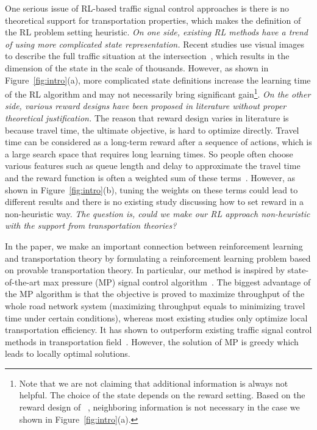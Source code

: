 {One serious issue of RL-based traffic signal control approaches is there is no theoretical support for transportation properties, which makes the definition of the RL problem setting heuristic. 
\emph{On one side, existing RL methods have a trend of using more complicated state representation.} Recent studies use visual images to describe the full traffic situation at the intersection~\cite{VaOl16,wei2018intellilight}, which results in the dimension of the state in the scale of thousands. However, as shown in Figure~\ref{fig:intro}(a), more complicated state definitions increase the learning time of the RL algorithm and may not necessarily bring significant gain\footnote{Note that we are not claiming that additional information is always not helpful. The choice of the state depends on the reward setting. Based on the reward design of \Deeplight~\cite{wei2018intellilight}, neighboring information is not necessary in the case we shown in Figure~\ref{fig:intro}(a).}. 
\emph{On the other side, various reward designs have been proposed in literature without proper theoretical justification.} The reason that reward design varies in literature is because travel time, the ultimate objective, is hard to optimize directly. Travel time can be considered as a long-term reward after a sequence of actions, which is a large search space that requires long learning times. So people often choose various features such as queue length and delay to approximate the travel time and the reward function is often a weighted sum of these terms~\cite{VaOl16,BPT14,ElAb10,ElAA13,wei2018intellilight}. However, as shown in Figure~\ref{fig:intro}(b), tuning the weights on these terms could lead to different results and there is no existing study discussing how to set reward in a non-heuristic way. \emph{The question is, could we make our RL approach non-heuristic with the support from transportation theories?}

In the paper, we make an important connection between reinforcement learning and transportation theory by formulating a reinforcement learning problem based on provable transportation theory. In particular, our method is inspired by state-of-the-art max pressure (MP) signal control algorithm~\cite{MP13,MP13book}. The biggest advantage of the MP algorithm is that the objective is proved to maximize throughput of the whole road network system (maximizing throughput equals to minimizing travel time under certain conditions), whereas most existing studies only optimize local transportation efficiency. It has shown to outperform existing traffic signal control methods in transportation field~\cite{MP13,MP13book}. However, the solution of MP is greedy which leads to locally optimal solutions. 

}
